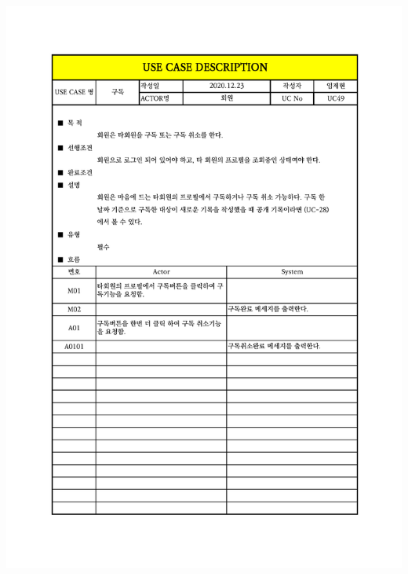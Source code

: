 {{{{{{{{{{{{{{{{{{{{{{{{{{{{{{{{{{{{{{{{{{{{{{{{{{{{\includegraphics[width=1.1\textwidth]{./Figure/Design/Display/usecase/049.pdf} \\
}}}}}}}}}}}}}}}}}}}}}}}}}}}}}}}}}}}}}}}}}}}}}}}}}}}}
